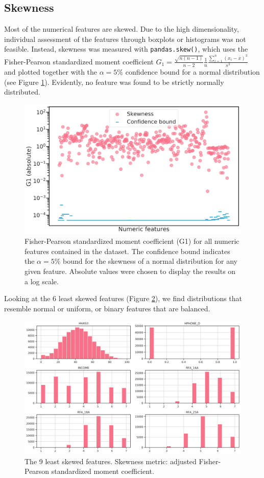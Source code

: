 \documentclass[
  11pt,
  a4paper,
  DIV=12,captions=tableheading,oneside,titlepage=firstiscover,abstracton]{scrreprt}
\begin{document}
\hypertarget{skewness}{%
\subsection{Skewness}\label{skewness}}

Most of the numerical features are skewed. Due to the high dimensionality, individual assessment of the features through boxplots or histograms was not feasible. Instead, skewness was measured with \texttt{pandas.skew()}, which uses the Fisher-Pearson standardized moment coefficient \(G_1 = \frac{\sqrt{n(n-1)}}{n-2} \frac{1}{n} \frac{\sum_{i=1}^n (x_i-\bar{x})^3}{s^3}\) and plotted together with the \(\alpha=5 \%\) confidence bound for a normal distribution (see Figure \ref{fig:skew-all}). Evidently, no feature was found to be strictly normally distributed.



\begin{figure}

{\centering \includegraphics[width=0.6\linewidth]{figures/eda/skewness-numeric-features} 

}

\caption{Fisher-Pearson standardized moment coefficient (G1) for all numeric features contained in the dataset. The confidence bound indicates the \(\alpha = 5 \%\) bound for the skewness of a normal distribution for any given feature. Absolute values were chosen to display the results on a log scale.}\label{fig:skew-all}
\end{figure}

Looking at the 6 least skewed features (Figure \ref{fig:least-skewed}), we find distributions that resemble normal or uniform, or binary features that are balanced.

\begin{figure}

{\centering \includegraphics[width=0.6\linewidth]{figures/eda/least-skewed} 

}

\caption{The 9 least skewed features. Skewness metric: adjusted Fisher-Pearson standardized moment coefficient.}\label{fig:least-skewed}
\end{figure}
\end{document}
